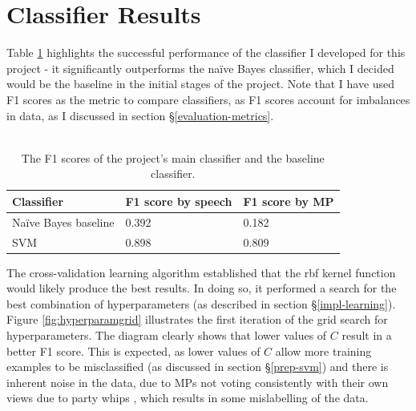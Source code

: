 \documentclass[12pt,a4paper,twoside,openright]{report}
\begin{document}
\section{Classifier Results} \label{eval-results}

Table \ref{table:results} highlights the successful performance of the classifier I developed for this project - it significantly outperforms the na\"{i}ve Bayes classifier, which I decided would be the baseline in the initial stages of the project. Note that I have used F1 scores as the metric to compare classifiers, as F1 scores account for imbalances in data, as I discussed in section \S\ref{evaluation-metrics}.
\\\\
\begin{table}[]
	\centering
	\begin{tabular}{lll}
		\hline
		\textbf{Classifier}      & \textbf{F1 score by speech} & \textbf{F1 score by MP} \\ \hline
		Na\"{i}ve Bayes baseline & 0.392                       & 0.182                   \\
		SVM                      & 0.898                       & 0.809                   \\ \hline
	\end{tabular}
	\caption{The F1 scores of the project's main classifier and the baseline classifier.}
	\label{table:results}	
\end{table}

The cross-validation learning algorithm established that the rbf kernel function would likely produce the best results. In doing so, it performed a search for the best combination of hyperparameters (as described in section \S\ref{impl-learning}). Figure \ref{fig:hyperparamgrid} illustrates the first iteration of the grid search for hyperparameters. The diagram clearly shows that lower values of $C$ result in a better F1 score. This is expected, as lower values of $C$ allow more training examples to be misclassified (as discussed in section \S\ref{prep-svm}) and there is inherent noise in the data, due to MPs not voting consistently with their own views due to party whips \cite{whips}, which results in some mislabelling of the data.
\\\\
\end{document}
